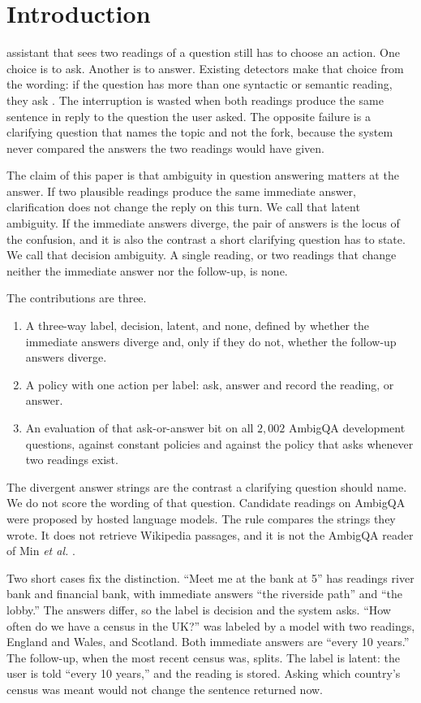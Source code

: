 \documentclass[journal]{IEEEtran}
\begin{document}
\section{Introduction}
 assistant that sees two readings of a question still has to choose an action.
One choice is to ask.
Another is to answer.
Existing detectors make that choice from the wording: if the question has more than one syntactic or semantic reading, they ask \cite{aliannejadi-etal-2019-asking,rao-daume-iii-2018-learning,zhang-choi-2025-clarify}.
The interruption is wasted when both readings produce the same sentence in reply to the question the user asked.
The opposite failure is a clarifying question that names the topic and not the fork, because the system never compared the answers the two readings would have given.

The claim of this paper is that ambiguity in question answering matters at the answer.
If two plausible readings produce the same immediate answer, clarification does not change the reply on this turn.
We call that latent ambiguity.
If the immediate answers diverge, the pair of answers is the locus of the confusion, and it is also the contrast a short clarifying question has to state.
We call that decision ambiguity.
A single reading, or two readings that change neither the immediate answer nor the follow-up, is none.

The contributions are three.
\begin{enumerate}
\item A three-way label, decision, latent, and none, defined by whether the immediate answers diverge and, only if they do not, whether the follow-up answers diverge.
\item A policy with one action per label: ask, answer and record the reading, or answer.
\item An evaluation of that ask-or-answer bit on all $2{,}002$ AmbigQA development questions, against constant policies and against the policy that asks whenever two readings exist.
\end{enumerate}
The divergent answer strings are the contrast a clarifying question should name.
We do not score the wording of that question.
Candidate readings on AmbigQA were proposed by hosted language models.
The rule compares the strings they wrote.
It does not retrieve Wikipedia passages, and it is not the AmbigQA reader of Min \emph{et al.} \cite{min-etal-2020-ambigqa}.

Two short cases fix the distinction.
``Meet me at the bank at 5'' has readings river bank and financial bank, with immediate answers ``the riverside path'' and ``the lobby.''
The answers differ, so the label is decision and the system asks.
``How often do we have a census in the UK?'' was labeled by a model with two readings, England and Wales, and Scotland.
Both immediate answers are ``every 10 years.''
The follow-up, when the most recent census was, splits.
The label is latent: the user is told ``every 10 years,'' and the reading is stored.
Asking which country's census was meant would not change the sentence returned now.
\end{document}
